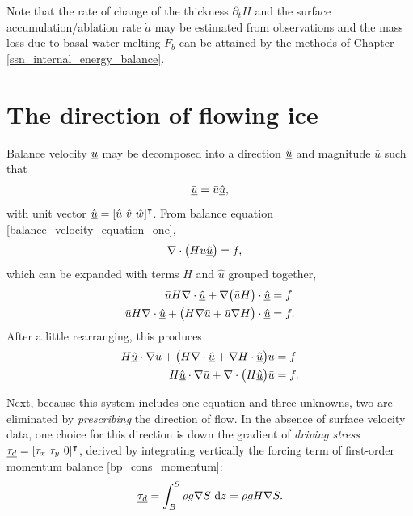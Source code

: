 Note that the rate of change of the thickness $\partial_t H$ and the surface accumulation/ablation rate $\dot{a}$ may be estimated from observations and the mass loss due to basal water melting $F_b$ can be attained by the methods of Chapter \cref{ssn_internal_energy_balance}.

\section{The direction of flowing ice}

Balance velocity $\bar{\underline{u}}$ may be decomposed into a direction $\hat{\underline{u}}$ and magnitude $\bar{u}$ \citep{brinkerhoff_2015} such that
\begin{align}
  \label{balance_velocity_dir_and_mag}
  \bar{\underline{u}} = \bar{u} \underline{\hat{u}},
\end{align}
with unit vector $\hat{\rankone{u}} = [\hat{u}\ \hat{v}\ \hat{w}]\T$.  From balance equation \cref{balance_velocity_equation_one},
\begin{align}
  \label{balance_velocity_equation}
  \nabla \cdot \big( H \bar{u} \underline{\hat{u}} \big) &= f,
\end{align}
which can be expanded with terms $H$ and $\hat{u}$ grouped together,
\begin{align*}
  \bar{u} H \nabla \cdot \underline{\hat{u}} + \nabla \big( \bar{u} H \big) \cdot \underline{\hat{u}} &= f \\
  \bar{u} H \nabla \cdot \underline{\hat{u}} + \big( H \nabla \bar{u} + \bar{u} \nabla H \big) \cdot \underline{\hat{u}} &= f.
\end{align*}
After a little rearranging, this produces
\begin{align}
  H \hat{\underline{u}} \cdot \nabla \bar{u} + \big( H \nabla \cdot \underline{\hat{u}} + \nabla H \cdot \underline{\hat{u}} \big) \bar{u} &= f \notag \\
  \label{balance_velocity_equation_expanded}
  H \hat{\underline{u}} \cdot \nabla \bar{u} + \nabla \cdot \big( H \underline{\hat{u}} \big) \bar{u} &= f.
\end{align}

Next, because this system includes one equation and three unknowns, two are eliminated by \emph{prescribing} the direction of flow.  In the absence of surface velocity data, one choice for this direction is down the gradient of  \emph{driving stress} $\underline{\tau_d} = [\tau_x\ \tau_y\ 0]^\intercal$, derived by integrating vertically the forcing term of first-order momentum balance \cref{bp_cons_momentum}:
\begin{align}
  \label{driving_stress}
  \underline{\tau_d} = \int_B^S \rho g \nabla S \ \mathrm{d}z = \rho g H \nabla S.
\end{align}

